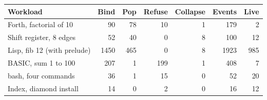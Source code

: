 \begin{tabular}{lrrrrrr}
\toprule
Workload & Bind & Pop & Refuse & Collapse & Events & Live\\
\midrule
Forth, factorial of 10 & 90 & 78 & 10 & 1 & 179 & 2 \\
Shift register, 8 edges & 52 & 40 & 0 & 8 & 100 & 12 \\
Lisp, fib 12 (with prelude) & 1450 & 465 & 0 & 8 & 1923 & 985 \\
BASIC, sum 1 to 100 & 207 & 1 & 199 & 1 & 408 & 7 \\
bash, four commands & 36 & 1 & 15 & 0 & 52 & 20 \\
Index, diamond install & 14 & 0 & 2 & 0 & 16 & 12 \\
\bottomrule
\end{tabular}
